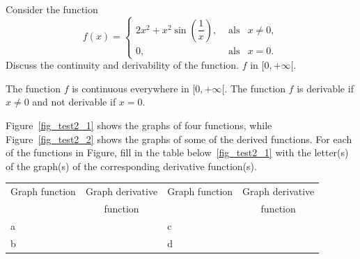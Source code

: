 \begin{Exercise}Consider the function 
\[ f(x)= \left\{\begin{array}{rcl} 
2x^2+x^2\sin \left( \dfrac{1}{x}\right), & \text{ als} & x \neq0, \\
0, & \text{ als} & x = 0. 
\end{array}  \right.   \]
Discuss the continuity and derivability of the function. $f$ in $[0, +\infty[$. 
\end{Exercise}

\begin{Answer}
The function $f$ is continuous everywhere in $[0, +\infty[$. The function $f$ is derivable if $x\neq 0$ and not derivable if $x=0$.    
\end{Answer}



\begin{Exercise} Figure~\ref{fig_test2_1} shows the graphs of four functions, while Figure~\ref{fig_test2_2} shows the graphs of some of the derived functions. For each of the functions in Figure, fill in the table below~\ref{fig_test2_1} with the letter(s) of the graph(s) of the corresponding derivative function(s).

\renewcommand{\arraystretch}{1.25}
\begin{tabular}{l|c|l|c}
Graph function&Graph derivative &Graph function&Graph derivative\\
&function&& function\\\hline
a&&c&\\[0.2cm]\hline
b&&d&\\
\end{tabular}
\renewcommand{\arraystretch}{1.25}

%
 	

\end{Exercise}
